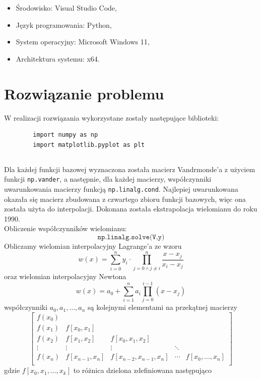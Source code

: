 \documentclass[11pt]{scrartcl}
\begin{document}
    \begin{itemize}
        \item Środowisko: Visual Studio Code,
        \item Język programowania: Python,
        \item System operacyjny: Microsoft Windows 11,
        \item Architektura systemu: x64.
    \end{itemize}

    \section{Rozwiązanie problemu}

    W realizacji rozwiązania wykorzystane zostały następujące biblioteki:
    \begin{lstlisting}
        import numpy as np
        import matplotlib.pyplot as plt
    \end{lstlisting}

    \subsection*{}
    Dla każdej funkcji bazowej wyznaczona została macierz Vandrmonde'a z użyciem
    funkcji \texttt{np.vander}, a następnie, dla każdej macierzy, współczynniki
    uwarunkowania macierzy funkcją \texttt{np.linalg.cond}. Najlepiej uwarunkowana
    okazała się macierz zbudowana z czwartego zbioru funkcji bazowych, więc ona
    została użyta do interpolacji. Dokonana została ekstrapolacja wielomianu do
    roku 1990. \\
    Obliczenie współczynników wielomianu:
    \[
        \texttt{np.linalg.solve(V,y)}
    \]
    Obliczamy wielomian interpolacyjny Lagrange'a ze wzoru
    \[
        w(x)=\sum_{i=0}^{n}y_i \cdot \prod_{j=0 \land j \neq i}^{n}
        \frac{x-x_j}{x_i-x_j}
    \]
    oraz wielomian interpolacyjny Newtona
    \[
        w(x)=a_0+ \sum_{i=1}^{n} a_i \prod_{j=0}^{i-1} (x-x_j)
    \]
    współczynniki $a_0,a_1, \ldots ,a_n$ są kolejnymi elementami na przekątnej
    macierzy
    \[
        \begin{bmatrix}
            f(x_0) \\
            f(x_1) & f[x_0,x_1] \\
            f(x_2) & f[x_1,x_2] & f[x_0,x_1,x_2] \\
            \vdots & \vdots & \vdots & \ddots \\
            f(x_n) & f[x_{n-1},x_n] & f[x_{n-2},x_{n-1},x_n] & \cdots &
            f[x_0, \ldots ,x_n] \\
        \end{bmatrix}
    \]
    gdzie $f[x_0,x_1, \ldots ,x_k]$ to różnica dzielona zdefiniowana następująco
    
\end{document}
